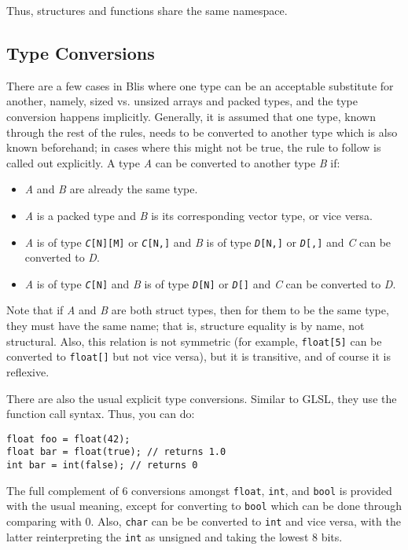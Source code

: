 \documentclass[11pt]{article}
\newcommand{\code}[1]{\texttt{#1}}
\begin{document}
Thus, structures and functions share the same namespace.

\subsection{Type Conversions} \label{conversions}

There are a few cases in Blis where one type can be an acceptable substitute for another, namely, sized vs. unsized arrays and packed types, and the type conversion happens implicitly. Generally, it is assumed that one type, known through the rest of the rules, needs to be converted to another type which is also known beforehand; in cases where this might not be true, the rule to follow is called out explicitly. A type \textit{A} can be converted to another type \textit{B} if:

\begin{itemize}
	\item \textit{A} and \textit{B} are already the same type.
	\item \textit{A} is a packed type and \textit{B} is its corresponding vector type, or vice versa.
	\item \textit{A} is of type \code{\textit{C}[N][M]} or \code{\textit{C}[N,]} and \textit{B} is of type \code{\textit{D}[N,]} or \code{\textit{D}[,]} and \textit{C} can be converted to \textit{D}.
	\item \textit{A} is of type \code{\textit{C}[N]} and \textit{B} is of type \code{\textit{D}[N]} or \code{\textit{D}[]} and \textit{C} can be converted to \textit{D}.
\end{itemize}

Note that if \textit{A} and \textit{B} are both struct types, then for them to be the same type, they must have the same name; that is, structure  equality is by name, not structural. Also, this relation is not symmetric (for example, \code{float[5]} can be converted to \code{float[]} but not vice versa), but it is transitive, and of course it is reflexive.

There are also the usual explicit type conversions. Similar to GLSL, they use the function call syntax. Thus, you can do:

\begin{lstlisting}
float foo = float(42);
float bar = float(true); // returns 1.0
int bar = int(false); // returns 0
\end{lstlisting}

The full complement of 6 conversions amongst \code{float}, \code{int}, and \code{bool} is provided with the usual meaning, except for converting to \code{bool} which can be done through comparing with 0. Also, \code{char} can be be converted to \code{int} and vice versa, with the latter reinterpreting the \code{int} as unsigned and taking the lowest 8 bits.
\end{document}
